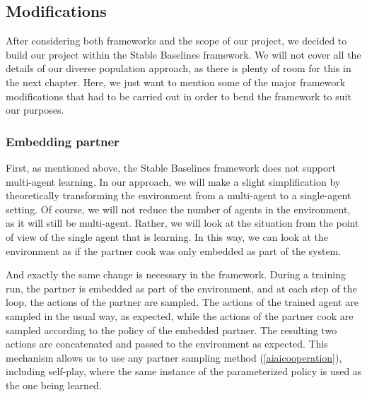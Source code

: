 \subsection{Modifications}
After considering both frameworks and the scope of our project, we decided to build our project within the Stable Baselines framework.
We will not cover all the details of our diverse population approach, as there is plenty of room for this in the next chapter.
Here, we just want to mention some of the major framework modifications that had to be carried out in order to bend the framework to suit our purposes.

\subsubsection*{Embedding partner}
First, as mentioned above, the Stable Baselines framework does not support multi-agent learning.
In our approach, we will make a slight simplification by theoretically transforming the environment from a multi-agent to a single-agent setting.
Of course, we will not reduce the number of agents in the environment, as it will still be multi-agent.
Rather, we will look at the situation from the point of view of the single agent that is learning. 
In this way, we can look at the environment as if the partner cook was only embedded as part of the system.

And exactly the same change is necessary in the framework.
During a training run, the partner is embedded as part of the environment, and at each step of the loop, the actions of the partner are sampled.
The actions of the trained agent are sampled in the usual way, as expected, while the actions of the partner cook are sampled according to the policy of the embedded partner.
The resulting two actions are concatenated and passed to the environment as expected.
This mechanism allows us to use any partner sampling method (\ref{aiaicooperation}), including self-play, where the same instance of the parameterized policy is used as the one being learned.



